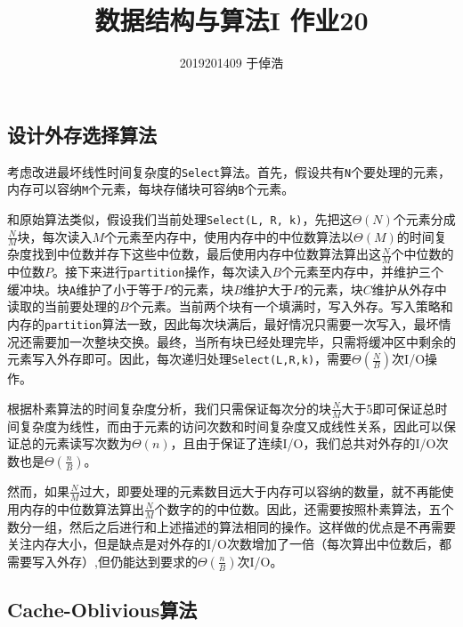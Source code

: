 \documentclass[]{article}
\title{数据结构与算法I 作业20}
\author{2019201409 于倬浩}
\begin{document}
\maketitle


\hypertarget{header-n32}{%
\subsection{设计外存选择算法}\label{header-n32}}

考虑改进最坏线性时间复杂度的\texttt{Select}算法。首先，假设共有\texttt{N}个要处理的元素，内存可以容纳\texttt{M}个元素，每块存储块可容纳\texttt{B}个元素。

和原始算法类似，假设我们当前处理\texttt{Select(L,\ R,\ k)}，先把这\(\Theta(N)\)个元素分成\(\frac{N}{M}\)块，每次读入\(M\)个元素至内存中，使用内存中的中位数算法以\(\Theta(M)\)的时间复杂度找到中位数并存下这些中位数，最后使用内存中位数算法算出这\(\frac{N}{M}\)个中位数的中位数\(P\)。接下来进行\texttt{partition}操作，每次读入\(B\)个元素至内存中，并维护三个缓冲块。块\texttt{A}维护了小于等于\(P\)的元素，块\(B\)维护大于\(P\)的元素，块\(C\)维护从外存中读取的当前要处理的\(B\)个元素。当前两个块有一个填满时，写入外存。写入策略和内存的\texttt{partition}算法一致，因此每次块满后，最好情况只需要一次写入，最坏情况还需要加一次整块交换。最终，当所有块已经处理完毕，只需将缓冲区中剩余的元素写入外存即可。因此，每次递归处理\texttt{Select(L,R,k)}，需要\(\Theta(\frac{N}{B})\)次I/O操作。

根据朴素算法的时间复杂度分析，我们只需保证每次分的块\(\frac{N}{M}\)大于5即可保证总时间复杂度为线性，而由于元素的访问次数和时间复杂度又成线性关系，因此可以保证总的元素读写次数为\(\Theta(n)\)，且由于保证了连续I/O，我们总共对外存的I/O次数也是\(\Theta(\frac{n}{B})\)。

然而，如果\(\frac{N}{M}\)过大，即要处理的元素数目远大于内存可以容纳的数量，就不再能使用内存的中位数算法算出\(\frac{N}{M}\)个数字的的中位数。因此，还需要按照朴素算法，五个数分一组，然后之后进行和上述描述的算法相同的操作。这样做的优点是不再需要关注内存大小，但是缺点是对外存的I/O次数增加了一倍（每次算出中位数后，都需要写入外存）,但仍能达到要求的\(\Theta(\frac{n}{B})\)次I/O。

\newpage

\hypertarget{header-n38}{%
\subsection{Cache-Oblivious算法}\label{header-n38}}
\end{document}
